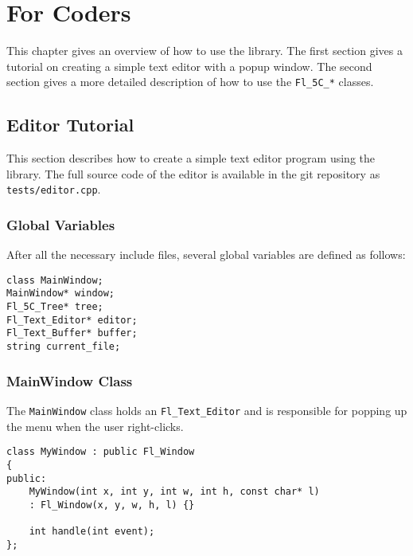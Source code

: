 %

\chapter{For Coders}

This chapter gives an overview of how to use the \fc{} library.  The first
section gives a tutorial on creating a simple text editor with a popup \fc{}
window.  The second section gives a more detailed description of how to use
the \texttt{Fl\_5C\_*} classes.

\section{Editor Tutorial}

This section describes how to create a simple text editor program using the
\fc{} library.  The full source code of the editor is available in the git
repository as \texttt{tests/editor.cpp}.

\subsection{Global Variables}

After all the necessary include files, several global variables are defined as
follows:

\begin{samepage}
\begin{verbatim}
class MainWindow;
MainWindow* window;
Fl_5C_Tree* tree;
Fl_Text_Editor* editor;
Fl_Text_Buffer* buffer;
string current_file;
\end{verbatim}
\end{samepage}

\subsection{MainWindow Class}

The \texttt{MainWindow} class holds an \texttt{Fl\_Text\_Editor} and is
responsible for popping up the \fc{} menu when the user right-clicks.

\begin{samepage}
\begin{verbatim}
class MyWindow : public Fl_Window
{
public:
    MyWindow(int x, int y, int w, int h, const char* l)
    : Fl_Window(x, y, w, h, l) {}

    int handle(int event);
};
\end{verbatim}
\end{samepage}

